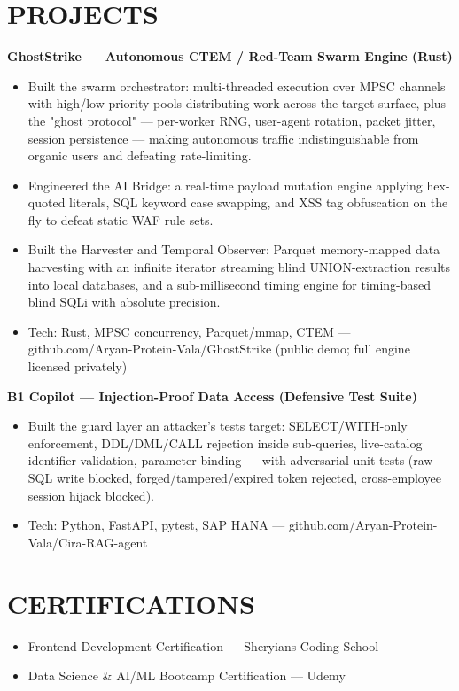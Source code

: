 \documentclass[9pt]{article}
\begin{document}
\section*{PROJECTS}
\textbf{GhostStrike  ---  Autonomous CTEM / Red-Team Swarm Engine (Rust)}
\vspace{1pt}
\begin{itemize}[leftmargin=11pt,itemsep=0pt,topsep=1pt,parsep=0pt]
\item Built the swarm orchestrator: multi-threaded execution over MPSC channels with high/low-priority pools distributing work across the target surface, plus the "ghost protocol"  ---  per-worker RNG, user-agent rotation, packet jitter, session persistence  ---  making autonomous traffic indistinguishable from organic users and defeating rate-limiting.
\item Engineered the AI Bridge: a real-time payload mutation engine applying hex-quoted literals, SQL keyword case swapping, and XSS tag obfuscation on the fly to defeat static WAF rule sets.
\item Built the Harvester and Temporal Observer: Parquet memory-mapped data harvesting with an infinite iterator streaming blind UNION-extraction results into local databases, and a sub-millisecond timing engine for timing-based blind SQLi with absolute precision.
\item Tech: Rust, MPSC concurrency, Parquet/mmap, CTEM  ---  github.com/Aryan-Protein-Vala/GhostStrike (public demo; full engine licensed privately)
\end{itemize}
\textbf{B1 Copilot  ---  Injection-Proof Data Access (Defensive Test Suite)}
\vspace{1pt}
\begin{itemize}[leftmargin=11pt,itemsep=0pt,topsep=1pt,parsep=0pt]
\item Built the guard layer an attacker's tests target: SELECT/WITH-only enforcement, DDL/DML/CALL rejection inside sub-queries, live-catalog identifier validation, parameter binding  ---  with adversarial unit tests (raw SQL write blocked, forged/tampered/expired token rejected, cross-employee session hijack blocked).
\item Tech: Python, FastAPI, pytest, SAP HANA  ---  github.com/Aryan-Protein-Vala/Cira-RAG-agent
\end{itemize}
\section*{CERTIFICATIONS}
\begin{itemize}[leftmargin=11pt,itemsep=0pt,topsep=1pt,parsep=0pt]
\item Frontend Development Certification  ---  Sheryians Coding School
\item Data Science \& AI/ML Bootcamp Certification  ---  Udemy
\end{itemize}
\end{document}
